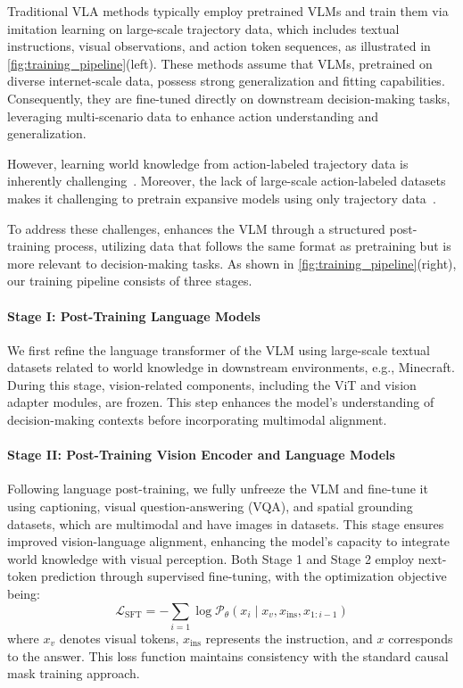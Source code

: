 Traditional VLA methods typically employ pretrained VLMs and train them via imitation learning on large-scale trajectory data, which includes textual instructions, visual observations, and action token sequences, as illustrated in \autoref{fig:training_pipeline}(left). These methods assume that VLMs, pretrained on diverse internet-scale data, possess strong generalization and fitting capabilities. Consequently, they are fine-tuned directly on downstream decision-making tasks, leveraging multi-scenario data to enhance action understanding and generalization.

However, learning world knowledge from action-labeled trajectory data is inherently challenging~\citep{vpt}. Moreover, the lack of large-scale action-labeled datasets makes it challenging to pretrain expansive models using only trajectory data~\citep{openx}.

To address these challenges, \method enhances the VLM through a structured post-training process, utilizing data that follows the same format as pretraining but is more relevant to decision-making tasks. As shown in \autoref{fig:training_pipeline}(right), our training pipeline consists of three stages.

\paragraph{Stage I: Post-Training Language Models} We first refine the language transformer of the VLM using large-scale textual datasets related to world knowledge in downstream environments, e.g., Minecraft. During this stage, vision-related components, including the ViT and vision adapter modules, are frozen. This step enhances the model’s understanding of decision-making contexts before incorporating multimodal alignment.

\paragraph{Stage II: Post-Training Vision Encoder and Language Models} Following language post-training, we fully unfreeze the VLM and fine-tune it using captioning, visual question-answering (VQA), and spatial grounding datasets, which are multimodal and have images in datasets. This stage ensures improved vision-language alignment, enhancing the model’s capacity to integrate world knowledge with visual perception. Both Stage 1 and Stage 2 employ next-token prediction through supervised fine-tuning, with the optimization objective being:
\begin{equation}
\mathcal{L}_\text{SFT} = - \sum_{i=1} \log \mathcal{P}_\theta (x_i \mid x_v, x_{\text{ins}}, x_{1:i-1}) \tag{1}
\end{equation}
where $x_v$ denotes visual tokens, $x_{\text{ins}}$ represents the instruction, and $x$ corresponds to the answer. This loss function maintains consistency with the standard causal mask training approach.

